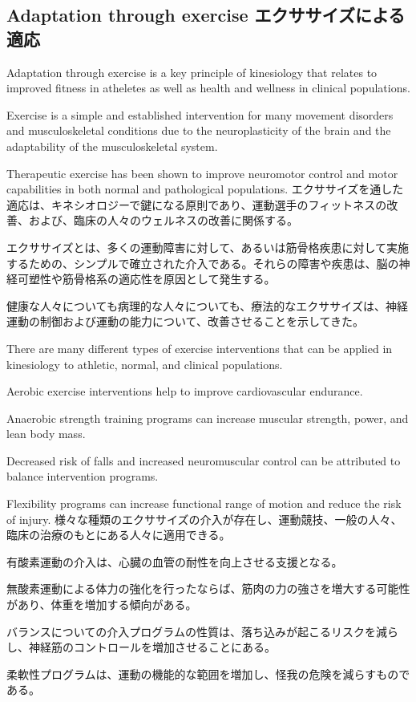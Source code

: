 \documentclass[uplatex,dvipdfmx]{jsarticle} \usepackage{amsmath,amssymb,bm}
\begin{document}
\subsection*{Adaptation through exercise エクササイズによる適応}
\begin{paracol}{2}
Adaptation through exercise is a key principle of kinesiology that relates to improved fitness in atheletes as well as health and wellness in clinical populations.

Exercise is a simple and established intervention for many movement disorders and musculoskeletal conditions due to the neuroplasticity of the brain and the adaptability of the musculoskeletal system.

Therapeutic exercise has been shown to improve neuromotor control and motor capabilities in both normal and pathological populations.
\switchcolumn
エクササイズを通した適応は、キネシオロジーで鍵になる原則であり、運動選手のフィットネスの改善、および、臨床の人々のウェルネスの改善に関係する。

エクササイズとは、多くの運動障害に対して、あるいは筋骨格疾患に対して実施するための、シンプルで確立された介入である。それらの障害や疾患は、脳の神経可塑性や筋骨格系の適応性を原因として発生する。

健康な人々についても病理的な人々についても、療法的なエクササイズは、神経運動の制御および運動の能力について、改善させることを示してきた。
\end{paracol}
\vspace{\baselineskip}
\begin{paracol}{2}
There are many different types of exercise interventions that can be applied in kinesiology to athletic, normal, and clinical populations.

Aerobic exercise interventions help to improve cardiovascular endurance.

Anaerobic strength training programs can increase muscular strength, power, and lean body mass.

Decreased risk of falls and increased neuromuscular control can be attributed to balance intervention programs.

Flexibility programs can increase functional range of motion and reduce the risk of injury.
\switchcolumn
様々な種類のエクササイズの介入が存在し、運動競技、一般の人々、臨床の治療のもとにある人々に適用できる。

有酸素運動の介入は、心臓の血管の耐性を向上させる支援となる。

無酸素運動による体力の強化を行ったならば、筋肉の力の強さを増大する可能性があり、体重を増加する傾向がある。

バランスについての介入プログラムの性質は、落ち込みが起こるリスクを減らし、神経筋のコントロールを増加させることにある。

柔軟性プログラムは、運動の機能的な範囲を増加し、怪我の危険を減らすものである。
\end{paracol}
\end{document}
